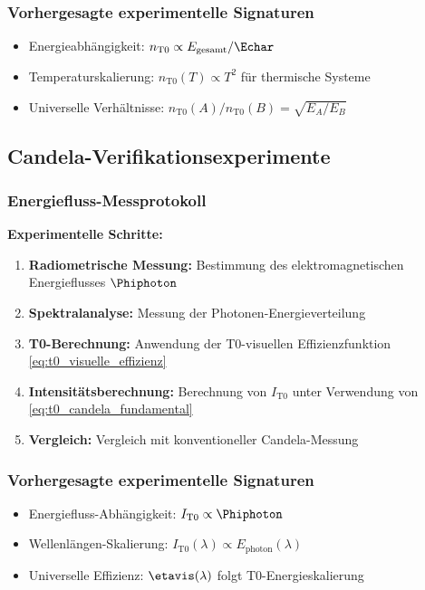 	\subsubsection{Vorhergesagte experimentelle Signaturen}
	\label{subsubsec:mol_experimentelle_signaturen}
	
	\begin{itemize}
		\item Energieabhängigkeit: $n_{\text{T0}} \propto E_{\text{gesamt}}/\Echar$
		\item Temperaturskalierung: $n_{\text{T0}}(T) \propto T^2$ für thermische Systeme
		\item Universelle Verhältnisse: $n_{\text{T0}}(A)/n_{\text{T0}}(B) = \sqrt{E_A/E_B}$
	\end{itemize}
	
	\subsection{Candela-Verifikationsexperimente}
	\label{subsec:candela_verifikation}
	
	\subsubsection{Energiefluss-Messprotokoll}
	\label{subsubsec:candela_energie_protokoll}
	
	\textbf{Experimentelle Schritte:}
	\begin{enumerate}
		\item \textbf{Radiometrische Messung:} Bestimmung des elektromagnetischen Energieflusses $\Phiphoton$
		\item \textbf{Spektralanalyse:} Messung der Photonen-Energieverteilung
		\item \textbf{T0-Berechnung:} Anwendung der T0-visuellen Effizienzfunktion \cref{eq:t0_visuelle_effizienz}
		\item \textbf{Intensitätsberechnung:} Berechnung von $I_{\text{T0}}$ unter Verwendung von \cref{eq:t0_candela_fundamental}
		\item \textbf{Vergleich:} Vergleich mit konventioneller Candela-Messung
	\end{enumerate}
	
	\subsubsection{Vorhergesagte experimentelle Signaturen}
	\label{subsubsec:candela_experimentelle_signaturen}
	
	\begin{itemize}
		\item Energiefluss-Abhängigkeit: $I_{\text{T0}} \propto \Phiphoton$
		\item Wellenlängen-Skalierung: $I_{\text{T0}}(\lambda) \propto E_{\text{photon}}(\lambda)$
		\item Universelle Effizienz: $\etavis(\lambda)$ folgt T0-Energieskalierung
	\end{itemize}
	
